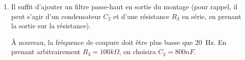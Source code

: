 \documentclass{../../template/tp}
\begin{document}
{\begin{enumerate}
        En prenant arbitrairement $R_1 = 1k\Omega$, on a $R_2 = 100k\Omega$, et donc $C >> 8 \mu F$.
        En pratique, un à deux ordres de grandeur suffisent~: prenons $C = 80 \mu F$.

        \item Il suffit d'ajouter un filtre passe-haut en sortie du montage (pour rappel, il peut s'agir d'un condensateur $C_2$ et d'une résistance $R_3$ en série, en prenant la sortie sur la résistance).

        À nouveau, la fréquence de coupure doit être plus basse que 20~Hz.
        En prenant arbitrairement $R_3 = 100 k\Omega$, on choisira $C_2 = 800 nF$.
    \end{enumerate}
}

\end{document}
